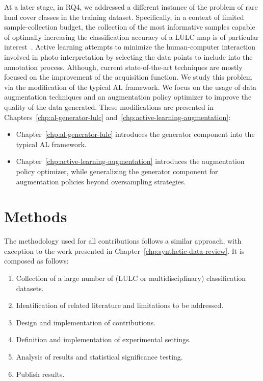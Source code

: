 At a later stage, in RQ4, we addressed a different instance of the problem of
rare land cover classes in the training dataset. Specifically, in a context of
limited sample-collection budget, the collection of the most informative
samples capable of optimally increasing the classification accuracy of a LULC
map is of particular interest~\cite{Su2020}. Active learning attempts to
minimize the human-computer interaction involved in photo-interpretation by
selecting the data points to include into the annotation process. Although,
current state-of-the-art techniques are mostly focused on the improvement of
the acquisition function. We study this problem via the modification of the
typical AL framework. We focus on the usage of data augmentation techniques
and an augmentation policy optimizer to improve the quality of the data
generated. These modifications are presented in
Chapters~\ref{chp:al-generator-lulc}
and~\ref{chp:active-learning-augmentation}:

\begin{itemize}
    \item Chapter~\ref{chp:al-generator-lulc} introduces the generator
        component into the typical AL framework.
    \item Chapter~\ref{chp:active-learning-augmentation} introduces the
        augmentation policy optimizer, while generalizing the generator
        component for augmentation policies beyond oversampling strategies.
\end{itemize}

\section{Methods}

The methodology used for all contributions follows a similar approach, with
exception to the work presented in Chapter~\ref{chp:synthetic-data-review}.
It is composed as follows:

\begin{enumerate}
    \item Collection of a large number of (LULC or multidisciplinary)
        classification datasets.
    \item Identification of related literature and limitations to be addressed.
    \item Design and implementation of contributions.
    \item Definition and implementation of experimental settings.
    \item Analysis of results and statistical significance testing.
    \item Publish results.
\end{enumerate}


